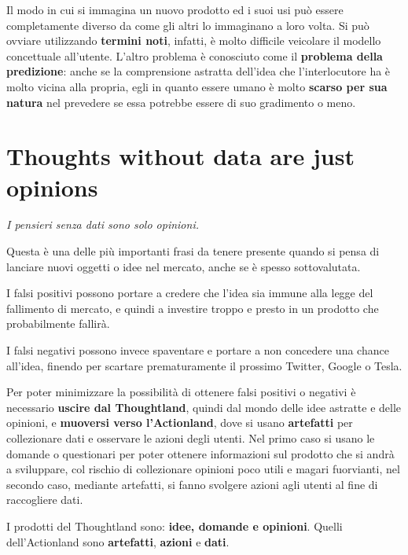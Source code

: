 Il modo in cui si immagina un nuovo prodotto ed i suoi usi può essere completamente diverso da come gli altri lo immaginano a loro volta. Si può ovviare utilizzando \textbf{termini noti}, infatti, è molto difficile veicolare il modello concettuale all'utente. L'altro problema è conosciuto come il \textbf{problema della predizione}: anche se la comprensione astratta dell'idea che l'interlocutore ha è molto vicina alla propria, egli in quanto essere umano è molto \textbf{scarso per sua natura} nel prevedere se essa potrebbe essere di suo gradimento o meno.


\section{Thoughts without data are just opinions}

\begin{flushleft}
	\textit{I pensieri senza dati sono solo opinioni.}
\end{flushleft}

Questa è una delle più importanti frasi da tenere presente quando si pensa di lanciare nuovi oggetti o idee nel mercato, anche se è spesso sottovalutata.

I falsi positivi possono portare a credere che l'idea sia immune alla legge del
fallimento di mercato, e quindi a investire troppo e presto in un prodotto che probabilmente fallirà.

I falsi negativi possono invece spaventare e portare a non concedere una chance all'idea, finendo per scartare prematuramente il prossimo Twitter, Google o Tesla.

Per poter minimizzare la possibilità di ottenere falsi positivi o negativi è necessario \textbf{uscire dal Thoughtland}, quindi dal mondo delle idee astratte e delle opinioni, e \textbf{muoversi verso l'Actionland}, dove si usano \textbf{artefatti} per collezionare dati e osservare le azioni degli utenti. Nel primo caso si usano le domande o questionari per poter ottenere informazioni sul prodotto
che si andrà a sviluppare, col rischio di collezionare opinioni poco utili e magari fuorvianti, nel secondo caso, mediante artefatti, si fanno svolgere azioni agli utenti al fine di raccogliere dati.

I prodotti del Thoughtland sono: \textbf{idee, domande e opinioni}. Quelli dell'Actionland sono \textbf{artefatti}, \textbf{azioni} e \textbf{dati}.


